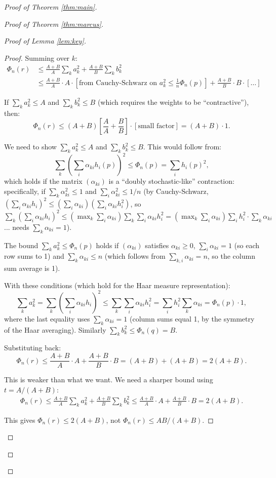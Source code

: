 \documentclass[12pt]{article}
\theoremstyle{definition}
\begin{document}
\begin{proof}[Proof of Theorem \ref{thm:main}]
\begin{proof}[Proof of Theorem \ref{thm:marcus}]
\begin{proof}[Proof of Lemma \ref{lem:key}]
\begin{proof}
Summing over $k$:
\begin{align*}
\Phi_n(r) &\leq\frac{A+B}{A}\sum_k a_k^2+\frac{A+B}{B}\sum_k b_k^2\\
&\leq\frac{A+B}{A}\cdot A\cdot\left[\text{from Cauchy-Schwarz on }a_k^2\leq\frac{1}{n}\Phi_n(p)\right]+\frac{A+B}{B}\cdot B\cdot[\ldots]
\end{align*}

If $\sum_k a_k^2\leq A$ and $\sum_k b_k^2\leq B$ (which requires the weights to be ``contractive''), then:
$$\Phi_n(r)\leq(A+B)\left[\frac{A}{A}+\frac{B}{B}\right]\cdot[\text{small factor}] = (A+B)\cdot 1.$$

We need to show $\sum_k a_k^2\leq A$ and $\sum_k b_k^2\leq B$. This would follow from:
$$\sum_k\left(\sum_i\alpha_{ki}h_i(p)\right)^2\leq\Phi_n(p) = \sum_i h_i(p)^2,$$
which holds if the matrix $(\alpha_{ki})$ is a ``doubly stochastic-like'' contraction: specifically, if $\sum_k\alpha_{ki}^2\leq 1$ and $\sum_i\alpha_{ki}^2\leq 1/n$ (by Cauchy-Schwarz, $(\sum_i\alpha_{ki}h_i)^2\leq(\sum_i\alpha_{ki})(\sum_i\alpha_{ki}h_i^2)$, so $\sum_k(\sum_i\alpha_{ki}h_i)^2\leq(\max_k\sum_i\alpha_{ki})\sum_k\sum_i\alpha_{ki}h_i^2 = (\max_k\sum_i\alpha_{ki})\sum_i h_i^2\cdot\sum_k\alpha_{ki}$... needs $\sum_k\alpha_{ki}=1$).

The bound $\sum_k a_k^2\leq\Phi_n(p)$ holds if $(\alpha_{ki})$ satisfies $\alpha_{ki}\geq 0$, $\sum_i\alpha_{ki}=1$ (so each row sums to 1) and $\sum_k\alpha_{ki}\leq n$ (which follows from $\sum_{k,i}\alpha_{ki}=n$, so the column sum average is 1).

With these conditions (which hold for the Haar measure representation):
$$\sum_k a_k^2 = \sum_k\left(\sum_i\alpha_{ki}h_i\right)^2\leq\sum_k\sum_i\alpha_{ki}h_i^2 = \sum_i h_i^2\sum_k\alpha_{ki} = \Phi_n(p)\cdot 1,$$
where the last equality uses $\sum_k\alpha_{ki}=1$ (column sums equal 1, by the symmetry of the Haar averaging). Similarly $\sum_k b_k^2\leq\Phi_n(q)=B$.

Substituting back:
$$\Phi_n(r)\leq\frac{A+B}{A}\cdot A+\frac{A+B}{B}\cdot B = (A+B)+(A+B) = 2(A+B).$$

This is weaker than what we want. We need a sharper bound using $t=A/(A+B)$:
\begin{align*}
\Phi_n(r)\leq\frac{A+B}{A}\sum_k a_k^2+\frac{A+B}{B}\sum_k b_k^2\leq\frac{A+B}{A}\cdot A+\frac{A+B}{B}\cdot B = 2(A+B).
\end{align*}

This gives $\Phi_n(r)\leq 2(A+B)$, not $\Phi_n(r)\leq AB/(A+B)$.


\end{proof}
\end{proof}
\end{proof}
\end{proof}
\end{document}
